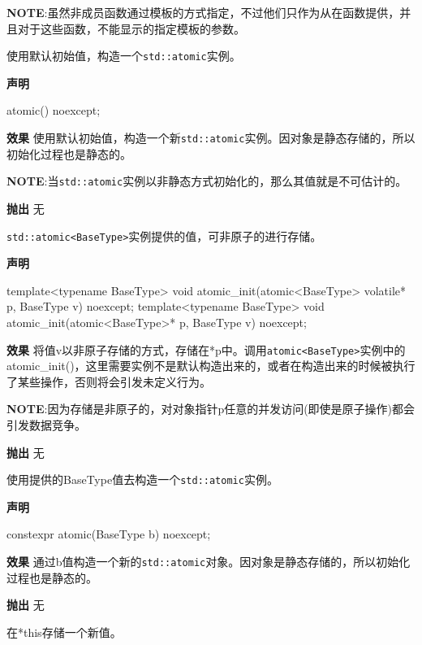\textbf{NOTE}:虽然非成员函数通过模板的方式指定，不过他们只作为从在函数提供，并且对于这些函数，不能显示的指定模板的参数。


使用默认初始值，构造一个\texttt{std::atomic}实例。

\textbf{声明}

\begin{cpp}
atomic() noexcept;
\end{cpp}

\textbf{效果}
使用默认初始值，构造一个新\texttt{std::atomic}实例。因对象是静态存储的，所以初始化过程也是静态的。

\textbf{NOTE}:当\texttt{std::atomic}实例以非静态方式初始化的，那么其值就是不可估计的。

\textbf{抛出}
无


\texttt{std::atomic<BaseType>}实例提供的值，可非原子的进行存储。

\textbf{声明}

\begin{cpp}
template<typename BaseType>
void atomic_init(atomic<BaseType> volatile* p, BaseType v) noexcept;
template<typename BaseType>
void atomic_init(atomic<BaseType>* p, BaseType v) noexcept;
\end{cpp}

\textbf{效果}
将值v以非原子存储的方式，存储在*p中。调用\texttt{atomic<BaseType>}实例中的atomic\_init()，这里需要实例不是默认构造出来的，或者在构造出来的时候被执行了某些操作，否则将会引发未定义行为。

\textbf{NOTE}:因为存储是非原子的，对对象指针p任意的并发访问(即使是原子操作)都会引发数据竞争。

\textbf{抛出}
无


使用提供的BaseType值去构造一个\texttt{std::atomic}实例。

\textbf{声明}

\begin{cpp}
constexpr atomic(BaseType b) noexcept;
\end{cpp}

\textbf{效果}
通过b值构造一个新的\texttt{std::atomic}对象。因对象是静态存储的，所以初始化过程也是静态的。

\textbf{抛出}
无


在*this存储一个新值。

